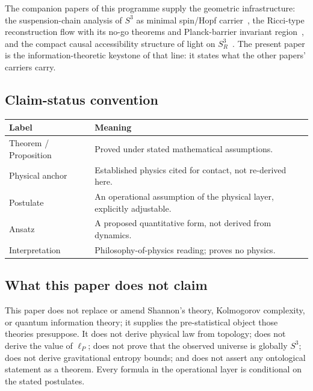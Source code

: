 \documentclass[11pt,a4paper]{article}
\theoremstyle{definition}
\theoremstyle{remark}
\newcommand{\Sthree}{S^{3}}
\newcommand{\lP}{\ell_{P}}
\begin{document}
The companion papers of this programme supply the geometric infrastructure: the suspension-chain
analysis of $\Sthree$ as minimal spin/Hopf carrier~\cite{PB2026susp}, the Ricci-type
reconstruction flow with its no-go theorems and Planck-barrier invariant
region~\cite{BP2026ricci}, and the compact causal accessibility structure of light on
$\Sthree_{R}$~\cite{PB2026light}.  The present paper is the information-theoretic keystone of
that line: it states what the other papers' carriers carry.

\subsection{Claim-status convention}

\begin{center}
\small
\begin{tabularx}{\textwidth}{@{}lX@{}}
\toprule
\textbf{Label} & \textbf{Meaning} \\
\midrule
Theorem / Proposition & Proved under stated mathematical assumptions.\\
Physical anchor & Established physics cited for contact, not re-derived here.\\
Postulate & An operational assumption of the physical layer, explicitly adjustable.\\
Ansatz & A proposed quantitative form, not derived from dynamics.\\
Interpretation & Philosophy-of-physics reading; proves no physics.\\
\bottomrule
\end{tabularx}
\end{center}

\subsection{What this paper does not claim}

\begin{tcolorbox}[colback=gray!4,colframe=gray!50,title=Boundary of the paper]
This paper does not replace or amend Shannon's theory, Kolmogorov complexity, or quantum
information theory; it supplies the pre-statistical object those theories presuppose.  It does
not derive physical law from topology; does not derive the value of $\lP$; does not prove that
the observed universe is globally $\Sthree$; does not derive gravitational entropy bounds; and
does not assert any ontological statement as a theorem.  Every formula in the operational layer
is conditional on the stated postulates.
\end{tcolorbox}
\end{document}
